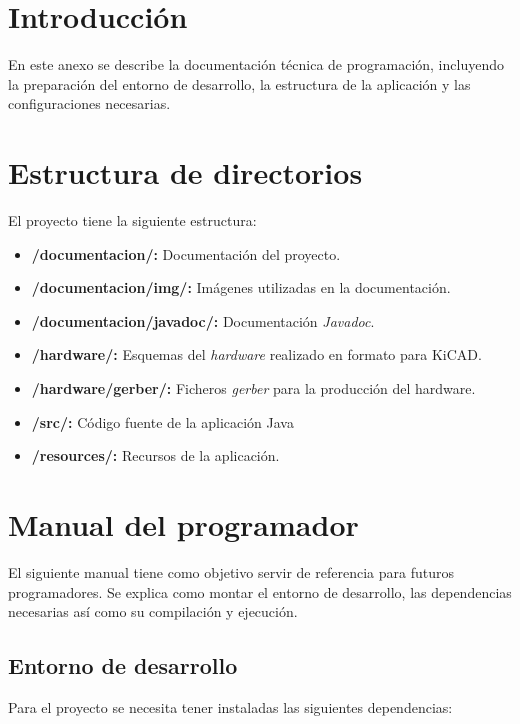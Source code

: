 
\section{Introducción}

En este anexo se describe la documentación técnica de programación, incluyendo la preparación del entorno de desarrollo, la estructura de la aplicación y las configuraciones necesarias.

\section{Estructura de directorios}

El proyecto tiene la siguiente estructura:

\begin{itemize}
\item
\textbf{/documentacion/:} Documentación del proyecto.
\item
\textbf{/documentacion/img/:} Imágenes utilizadas en la documentación.
\item
\textbf{/documentacion/javadoc/:} Documentación \emph{Javadoc}.
\item
\textbf{/hardware/:} Esquemas del \emph{hardware} realizado en formato para KiCAD.
\item
\textbf{/hardware/gerber/:} Ficheros \emph{gerber} para la producción del hardware.
\item
\textbf{/src/:} Código fuente de la aplicación Java
\item
\textbf{/resources/:} Recursos de la aplicación.

\end{itemize}


\section{Manual del programador}

El siguiente manual tiene como objetivo servir de referencia para futuros programadores. Se explica como montar el entorno de desarrollo, las dependencias necesarias así como su compilación y ejecución.

\subsection{Entorno de desarrollo}

Para el proyecto se necesita tener instaladas las siguientes dependencias:

